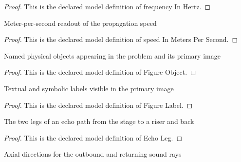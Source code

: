 \begin{proof}
  This is the declared model definition of frequency In Hertz.
\end{proof}
\begin{definition}
  \label{def:physics:phyx-mini-0310:phyxminiproblems-problemphyxmini0310-speedinmeterspersecond}
  Meter-per-second readout of the propagation speed
\end{definition}
\begin{proof}
  This is the declared model definition of speed In Meters Per Second.
\end{proof}
\begin{definition}
  \label{def:physics:phyx-mini-0310:phyxminiproblems-problemphyxmini0310-figureobject}
  Named physical objects appearing in the problem and its primary image
\end{definition}
\begin{proof}
  This is the declared model definition of Figure Object.
\end{proof}
\begin{definition}
  \label{def:physics:phyx-mini-0310:phyxminiproblems-problemphyxmini0310-figurelabel}
  Textual and symbolic labels visible in the primary image
\end{definition}
\begin{proof}
  This is the declared model definition of Figure Label.
\end{proof}
\begin{definition}
  \label{def:physics:phyx-mini-0310:phyxminiproblems-problemphyxmini0310-echoleg}
  The two legs of an echo path from the stage to a riser and back
\end{definition}
\begin{proof}
  This is the declared model definition of Echo Leg.
\end{proof}
\begin{definition}
  \label{def:physics:phyx-mini-0310:phyxminiproblems-problemphyxmini0310-axialdirection}
  Axial directions for the outbound and returning sound rays
\end{definition}
